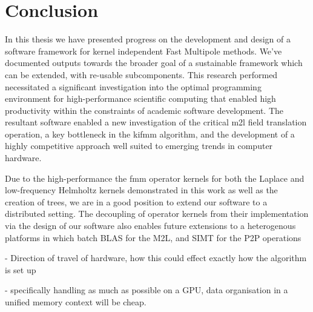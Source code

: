 \chapter{Conclusion}\label{chpt:conclusion}


In this thesis we have presented progress on the development and design of a software framework for kernel independent Fast Multipole methods. We've documented outputs towards the broader goal of a sustainable framework which can be extended, with re-usable subcomponents. This research performed necessitated a significant investigation into the optimal programming environment for high-performance scientific computing that enabled high productivity within the constraints of academic software development. The resultant software enabled a new investigation of the critical \acrshort{m2l} field translation operation, a key bottleneck in the \acrshort{kifmm} algorithm, and the development of a highly competitive approach well suited to emerging trends in computer hardware.

Due to the high-performance the \acrshort{fmm} operator kernels for both the Laplace and low-frequency Helmholtz kernels demonstrated in this work as well as the creation of trees, we are in a good position to extend our software to a distributed setting. The decoupling of operator kernels from their implementation via the design of our software also enables future extensions to a heterogenous platforms in which batch BLAS for the M2L, and SIMT for the P2P operations

- Direction of travel of hardware, how this could effect exactly how the algorithm is set up

- specifically handling as much as possible on a GPU, data organisation in a unified memory context will be cheap.

